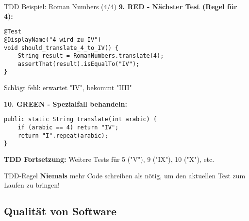 \begin{frame}[fragile]{TDD Beispiel: Roman Numbers (4/4)}
  \textbf{9. RED - Nächster Test (Regel für 4):}
  \begin{lstlisting}[style=java, basicstyle=\tiny\ttfamily]
@Test
@DisplayName("4 wird zu IV")
void should_translate_4_to_IV() {
    String result = RomanNumbers.translate(4);
    assertThat(result).isEqualTo("IV");
}
  \end{lstlisting}

  Schlägt fehl: erwartet "IV", bekommt "IIII"

  \textbf{10. GREEN - Spezialfall behandeln:}
  \begin{lstlisting}[style=java, basicstyle=\tiny\ttfamily]
public static String translate(int arabic) {
    if (arabic == 4) return "IV";
    return "I".repeat(arabic);
}
  \end{lstlisting}

  \textbf{TDD Fortsetzung:} Weitere Tests für 5 ("V"), 9 ("IX"), 10 ("X"), etc.

  \begin{alertblock}{TDD-Regel}
    \textbf{Niemals} mehr Code schreiben als nötig, um den aktuellen Test zum Laufen zu bringen!
  \end{alertblock}
\end{frame}


\subsection{Qualität von Software}

